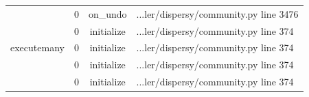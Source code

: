 \begin{table}[]
{\begin{tabular}{|c|c|c|l|}
			\multicolumn{1}{|c|}{\multirow{5}{*}{executemany}} & \multicolumn{1}{c|}{0} & \multicolumn{1}{c|}{on\_undo} & \multicolumn{1}{l|}{...ler/dispersy/community.py line 3476} \\ \cline{2-4}
			\multicolumn{1}{|c|}{} & \multicolumn{1}{c|}{0}  & \multicolumn{1}{c|}{initialize}  & \multicolumn{1}{l|}{...ler/dispersy/community.py line 374}  \\ \cline{2-4} 
			\multicolumn{1}{|c|}{} & \multicolumn{1}{c|}{0}  & \multicolumn{1}{c|}{initialize}  & \multicolumn{1}{l|}{...ler/dispersy/community.py line 374}  \\ \cline{2-4} 
			\multicolumn{1}{|c|}{} & \multicolumn{1}{c|}{0}  & \multicolumn{1}{c|}{initialize}  & \multicolumn{1}{l|}{...ler/dispersy/community.py line 374}  \\ \cline{2-4} 
			\multicolumn{1}{|c|}{} & \multicolumn{1}{c|}{0}  & \multicolumn{1}{c|}{initialize}  & \multicolumn{1}{l|}{...ler/dispersy/community.py line 374}  \\ \hline 
		\end{tabular}}
	\end{table}



